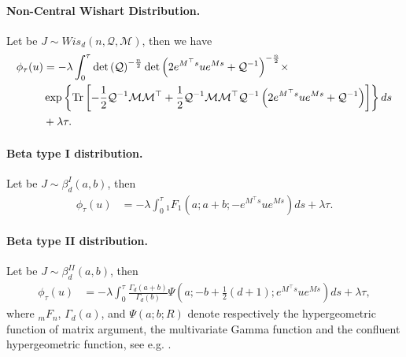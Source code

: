 \paragraph{\textbf{Non-Central Wishart Distribution.}}
Let be $J\sim Wis_d\left(n,\mathcal{Q},\mathcal{M}\right)$, then we have
\begin{align}
\phi_\tau(u)&=-\lambda\int_{0}^{\tau}{\det\left(\mathcal{Q}\right)^{-\frac{n}{2}}\det\left(2e^{M^{\top}s}ue^{Ms}+\mathcal{Q}^{-1}\right)^{-\frac{n}{2}}}\times\nonumber\\
&\exp\left\{\textup{Tr}\left[-\frac{1}{2}\mathcal{Q}^{-1}\mathcal{M}\mathcal{M}^{\top}+\frac{1}{2}\mathcal{Q}^{-1}\mathcal{M}\mathcal{M}^{\top}\mathcal{Q}^{-1}\left(2e^{M^{\top}s}ue^{Ms}+\mathcal{Q}^{-1}\right)\right]\right\}ds\nonumber\\
&+\lambda \tau.
\end{align}
\paragraph{\textbf{Beta type I distribution.}} Let be $J\sim\beta_d^I(a,b)$, then
\begin{align}
\phi_\tau(u)&=-\lambda\int_{0}^{\tau}{_{1}F_1(a;a+b;-e^{M^{\top}s}ue^{Ms})ds}+\lambda \tau.
\end{align}

\paragraph{\textbf{Beta  type II distribution.}} Let be $J\sim\beta_d^{II}(a,b)$, then
\begin{align}
\phi_\tau(u)&=-\lambda\int_{0}^{\tau}{\frac{\Gamma_d(a+b)}{\Gamma_d(b)}\Psi(a;-b+\frac{1}{2}(d+1);e^{M^{\top}s}ue^{Ms})ds}+\lambda \tau,
\end{align}
where $_{m}F_{n}$, $\Gamma_d(a)$, and $\Psi(a;b;R)$ denote respectively the hypergeometric function of matrix argument, the multivariate Gamma function and the confluent hypergeometric function, see e.g. \cite{book_GuptaNagar2000}.



